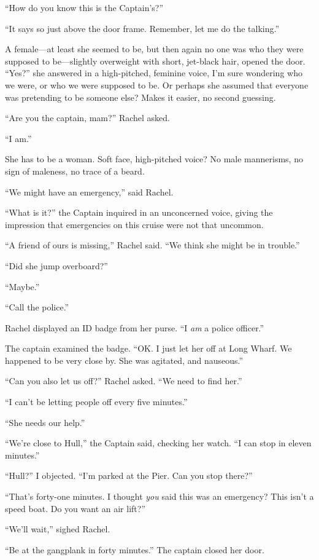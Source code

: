 ``How do you know this is the Captain's?''

``It says so just above the door frame. Remember, let me do the
talking.''

A female---at least she seemed to be, but then again no one was who they
were supposed to be---slightly overweight with short, jet-black hair,
opened the door. ``Yes?'' she answered in a high-pitched, feminine
voice, I'm sure wondering who we were, or who we were supposed to be. Or
perhaps she assumed that everyone was pretending to be someone else?
Makes it easier, no second guessing.

``Are you the captain, mam?'' Rachel asked.

``I am.''

She has to be a woman. Soft face, high-pitched voice? No male
mannerisms, no sign of maleness, no trace of a beard.

``We might have an emergency,'' said Rachel.

``What is it?'' the Captain inquired in an unconcerned voice, giving the
impression that emergencies on this cruise were not that uncommon.

``A friend of ours is missing,'' Rachel said. ``We think she might be in
trouble.''

``Did she jump overboard?''

``Maybe.''

``Call the police.''

Rachel displayed an ID badge from her purse. ``I \emph{am} a police
officer.''

The captain examined the badge. ``OK. I just let her off at Long Wharf.
We happened to be very close by. She was agitated, and nauseous.''

``Can you also let us off?'' Rachel asked. ``We need to find her.''

``I can't be letting people off every five minutes.''

``She needs our help.''

``We're close to Hull,'' the Captain said, checking her watch. ``I can
stop in eleven minutes.''

``Hull?'' I objected. ``I'm parked at the Pier. Can you stop there?''

``That's forty-one minutes. I thought \emph{you} said this was an
emergency? This isn't a speed boat. Do you want an air lift?''

``We'll wait,'' sighed Rachel.

``Be at the gangplank in forty minutes.'' The captain closed her door.

